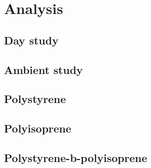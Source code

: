 \documentclass[MasterThesisMain.tex]{subfiles}
\begin{document}
	\chapter{Analysis}
	
	\section{Day study}
	
	\section{Ambient study}
	
	\section{Polystyrene}
	
	\section{Polyisoprene}
	
	\section{Polystyrene-b-polyisoprene}
\end{document}
